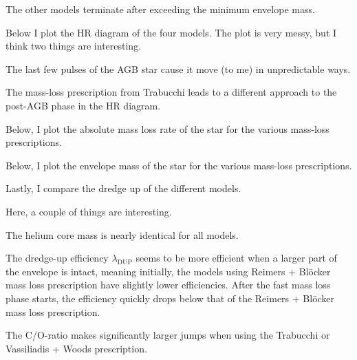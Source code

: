 \documentclass[a4paper,10pt]{article}
\begin{document}
The other models terminate after exceeding the minimum envelope mass.

Below I plot the HR diagram of the four models. The plot is very messy, but I think two things are interesting.

\begin{figure}[ht]
    \centering
\end{figure}

\begin{citemize}
    \item The last few pulses of the AGB star cause it move (to me) in unpredictable ways. 
    \item The mass-loss prescription from Trabucchi leads to a different approach to the post-AGB phase in the HR diagram.
\end{citemize}

Below, I plot the absolute mass loss rate of the star for the various mass-loss prescriptions.
\begin{figure}[ht]
    \centering
\end{figure}


\nextpage
Below, I plot the envelope mass of the star for the various mass-loss prescriptions.
\begin{figure}[ht]
    \centering
\end{figure}


Lastly, I compare the dredge up of the different models.
\begin{figure}[ht]
    \centering
\end{figure}

Here, a couple of things are interesting.
\begin{citemize}
    \item The helium core mass is nearly identical for all models. 
    \item  The dredge-up efficiency \(\lambda _\text{DUP}\) seems to be more efficient when a larger part of the envelope is intact, meaning initially, the models using Reimers + Blöcker mass loss prescription have slightly lower efficiencies. After the fast mass loss phase starts, the efficiency quickly drops below that of the \citet{cinquegrana2022} Reimers + Blöcker mass loss prescription.
    \item  The C/O-ratio makes significantly larger jumps when using the Trabucchi or Vassiliadis + Woods prescription.
\end{citemize}
\end{document}

